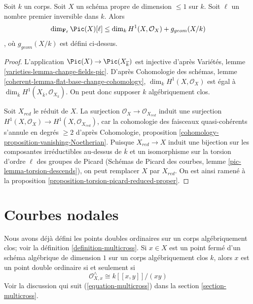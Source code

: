 \begin{lemma}
\label{lemma-bound-torsion-simple}
Soit $k$ un corps. Soit $X$ un schéma propre de dimension $\leq 1$ sur $k$. Soit $\ell$ un nombre premier inversible dans $k$. Alors $$
\dim_{\mathbf{F}_\ell} \Pic(X)[\ell] \leq
\dim_k H^1(X, \mathcal{O}_X) + g_{geom}(X/k)
$$, où $g_{geom}(X/k)$ est défini ci-dessus.
\end{lemma}

\begin{proof}
L'application $\Pic(X) \to \Pic(X_{\overline{k}})$ est injective d'après Variétés, lemme \ref{varieties-lemma-change-fields-pic}. D'après Cohomologie des schémas, lemme \ref{coherent-lemma-flat-base-change-cohomology}, $\dim_k H^1(X, \mathcal{O}_X)$ est égal à $\dim_{\overline{k}} H^1(X_{\overline{k}}, \mathcal{O}_{X_{\overline{k}}})$. On peut donc supposer $k$ algébriquement clos.

\medskip\noindent
Soit $X_{red}$ le réduit de $X$. La surjection $\mathcal{O}_X \to \mathcal{O}_{X_{red}}$ induit une surjection $H^1(X, \mathcal{O}_X) \to H^1(X, \mathcal{O}_{X_{red}})$, car la cohomologie des faisceaux quasi-cohérents s'annule en degrés $\geq 2$ d'après Cohomologie, proposition \ref{cohomology-proposition-vanishing-Noetherian}. Puisque $X_{red} \to X$ induit une bijection sur les composantes irréductibles au-dessus de $\overline{k}$ et un isomorphisme sur la torsion d'ordre $\ell$ des groupes de Picard (Schémas de Picard des courbes, lemme \ref{pic-lemma-torsion-descends}), on peut remplacer $X$ par $X_{red}$. On est ainsi ramené à la proposition \ref{proposition-torsion-picard-reduced-proper}.
\end{proof}






\section{Courbes nodales}
\label{section-nodal}

\noindent
Nous avons déjà défini les points doubles ordinaires sur un corps algébriquement clos; voir la définition \ref{definition-multicross}. Si $x \in X$ est un point fermé d'un schéma algébrique de dimension $1$ sur un corps algébriquement clos $k$, alors $x$ est un point double ordinaire si et seulement si $$
\mathcal{O}_{X, x}^\wedge \cong k[[x, y]]/(xy)
$$ Voir la discussion qui suit (\ref{equation-multicross}) dans la section \ref{section-multicross}.

